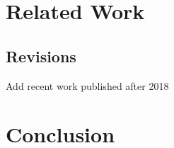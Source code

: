 \documentclass[global,twocolumn]{svjour}
\begin{document}
\section{Related Work} \label{sec:related-work}


\subsection{Revisions}
\begin{compactitem}
  \item Add recent work published after 2018
\end{compactitem}

\section{Conclusion} \label{sec:conclusion}


\clearpage



%  

% 
\end{document}
